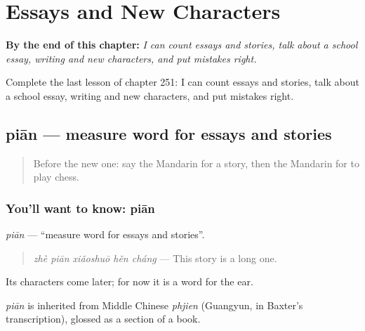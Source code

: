 
\chapter{Essays and New Characters}
\label{ch:zh-essays-and-new-characters}

\begin{chapteropening}
\textbf{By the end of this chapter:} \emph{I can count essays and stories, talk about a school essay, writing and new characters, and put mistakes right.}

Complete the last lesson of chapter 251: I can count essays and stories, talk about a school essay, writing and new characters, and put mistakes right.
\end{chapteropening}

\section[piān]{piān — measure word for essays and stories}

\label{lesson:ZH-C251-pian}



\begin{quote}
Before the new one: say the Mandarin for a story, then the Mandarin for to play chess.
\end{quote}

\subsection*{You'll want to know: piān}
\emph{piān} — \textquotedblleft{}measure word for essays and stories\textquotedblright{}.

\begin{quote}
\emph{zhè piān xiǎoshuō hěn cháng} — This story is a long one.
\end{quote}

Its characters come later; for now it is a word for the ear.

\begin{cousinweb}
\emph{piān} is inherited from Middle Chinese \emph{phjien} (Guangyun, in Baxter's transcription), glossed as a section of a book.
\end{cousinweb}

